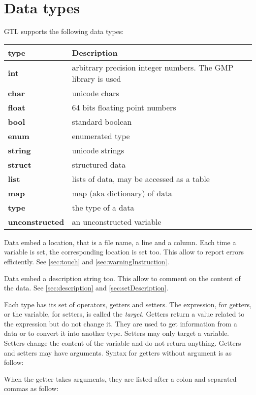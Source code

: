 \documentclass[10pt,openright,twosides]{report}
\begin{document}
\chapter{Data types}

GTL supports the following data types:
\begin{longtable}{>{\bfseries\ttfamily\small}l|l}
{\bf type}&{\bf Description}\\
\hline\endhead
 {int}&
  {arbitrary precision integer numbers. The GMP library is used}\\
 {char}&
  {unicode chars}\\
 {float}&
  {64 bits floating point numbers}\\
 {bool}&
  {standard boolean}\\
 {enum}&
  {enumerated type}\\
 {string}&
  {unicode strings}\\
 {struct}&
  {structured data}\\
 {list}&
  {lists of data, may be accessed as a table}\\
 {map}&
  {map (aka dictionary) of data}\\
 {type}&
  {the type of a data}\\
 {unconstructed}&
  {an unconstructed variable}
\end{longtable}

Data embed a location, that is a file name, a line and a column. Each time a variable is set, the corresponding location is set too. This allow to report errors efficiently. See \ref{sec:touch} and \ref{sec:warningInstruction}.

Data embed a description string too. This allow to comment on the content of the data. See \ref{sec:description} and \ref{sec:setDescription}.

Each type has its set of operators, getters and setters. The expression, for getters, or the variable, for setters, is called the {\em target}. Getters return a value related to the expression but do not change it. They are used to get information from a data or to convert it into another type.  Setters may only target a variable. Setters change the content of the variable and do not return anything. Getters and setters may have arguments. Syntax for getters without argument is as follow:

\begin{gtl}
\end{gtl}

When the getter takes arguments, they are listed after a colon and separated commas as follow:
\end{document}
